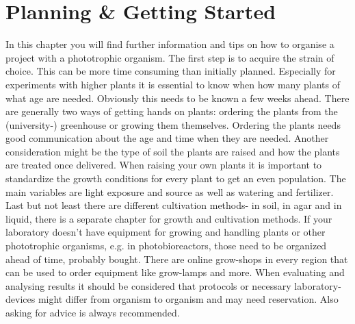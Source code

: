 \section{Planning \& Getting Started}
In this chapter you will find further information and tips on how to organise a project with a phototrophic organism. 
\newline\newline
The first step is to acquire the strain of choice. This can be more time consuming than initially planned. Especially for experiments with higher plants it is essential to know when how many plants of what age are needed. Obviously this needs to be known a few weeks ahead. 
\newline\newline
There are generally two ways of getting hands on plants: ordering the plants from the \\(university-) greenhouse or growing them themselves.
Ordering the plants needs good communication about the age and time when they are needed. Another consideration might be the type of soil the plants are raised and how the plants are treated once delivered.
\noindent
When raising your own plants it is important to standardize the growth conditions for every plant to get an even population. The main variables are light exposure and source as well as watering and fertilizer. 
Last but not least there are different cultivation methods- in soil, in agar and in liquid, there is a separate chapter for growth and cultivation methods.
\newline\newline
If your laboratory doesn't have equipment for growing and handling plants or other phototrophic organisms, e.g. in photobioreactors, those need to be organized ahead of time, probably bought. There are online grow-shops in every region that can be used to order equipment like grow-lamps and more.
\newline\newline
When evaluating and analysing results it should be considered that protocols or necessary laboratory-devices might differ from organism to organism and may need reservation. Also asking for advice is always recommended.

